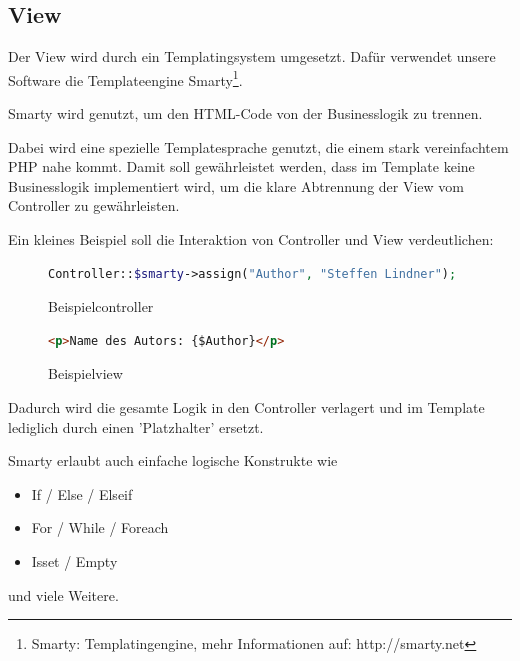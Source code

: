 \subsection{View} 

Der View wird durch ein Templatingsystem umgesetzt. Dafür verwendet 
unsere Software die Templateengine Smarty\footnote{Smarty: Templatingengine, mehr 
Informationen auf: http://smarty.net}.

Smarty wird genutzt, um den HTML-Code von der Businesslogik zu trennen. 

\pm

Dabei wird eine spezielle Templatesprache genutzt, die einem stark 
vereinfachtem PHP nahe kommt. Damit soll gewährleistet werden, dass im Template keine Businesslogik implementiert wird, um die klare Abtrennung der View vom Controller zu gewährleisten.

\pm

Ein kleines Beispiel soll die Interaktion von Controller und View verdeutlichen:

\begin{figure}[h!]
	\centering
	\begin{lstlisting}[language=php]
	Controller::$smarty->assign("Author", "Steffen Lindner");	
	\end{lstlisting}

    \caption{Beispielcontroller}
 \end{figure}
 
\begin{figure}[h!]
	\centering
	\begin{lstlisting}[language=html]
	<p>Name des Autors: {$Author}</p>
	\end{lstlisting}

    \caption{Beispielview}
 \end{figure}
 
Dadurch wird die gesamte Logik in den Controller verlagert und im Template lediglich durch einen 'Platzhalter' ersetzt.

\pm

Smarty erlaubt auch einfache logische Konstrukte wie 

\begin{itemize}
	\item If / Else / Elseif
	\item For / While / Foreach
	\item Isset / Empty
\end{itemize}


und viele Weitere. 

